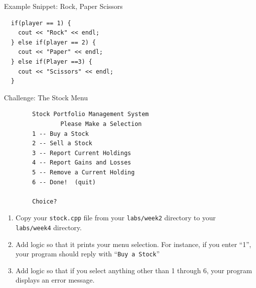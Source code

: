 \documentclass[]{beamer}
\begin{document}
\begin{frame}[fragile]{Example Snippet: Rock, Paper Scissors}
  \begin{BVerbatim}
  if(player == 1) {
    cout << "Rock" << endl;
  } else if(player == 2) {
    cout << "Paper" << endl;
  } else if(Player ==3) {
    cout << "Scissors" << endl;
  }
  \end{BVerbatim}
\end{frame}

\begin{frame}[fragile]{Challenge: The Stock Menu}
  \begin{adjustbox}{max height=0.45\textheight}
  \begin{BVerbatim}
        Stock Portfolio Management System
                Please Make a Selection
        1 -- Buy a Stock
        2 -- Sell a Stock
        3 -- Report Current Holdings
        4 -- Report Gains and Losses
        5 -- Remove a Current Holding
        6 -- Done!  (quit) 

        Choice? 
  \end{BVerbatim}
  \end{adjustbox}
  \begin{enumerate}[<+(1)->]
    \item Copy your \texttt{stock.cpp} file from your \texttt{labs/week2} directory to your \texttt{labs/week4} directory.
    \item Add logic so that it prints your menu selection.  For instance, if you enter ``1'', your program should reply with ``\texttt{Buy a Stock}''
    \item Add logic so that if you select anything other than 1 through 6, your program displays an error message.
  \end{enumerate}
\end{frame}
\end{document}
